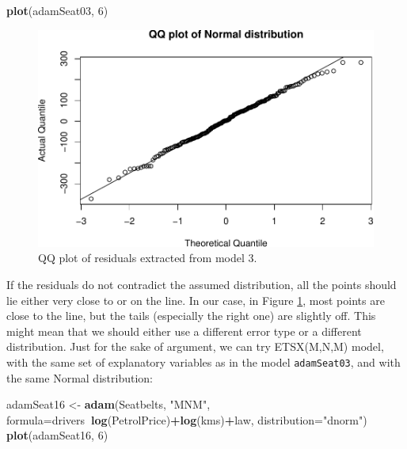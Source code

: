 \documentclass[]{book}
\newenvironment{Shaded}{\begin{snugshade}}{\end{snugshade}}
\newcommand{\DataTypeTok}[1]{\textcolor[rgb]{0.13,0.29,0.53}{#1}}
\newcommand{\DecValTok}[1]{\textcolor[rgb]{0.00,0.00,0.81}{#1}}
\newcommand{\KeywordTok}[1]{\textcolor[rgb]{0.13,0.29,0.53}{\textbf{#1}}}
\newcommand{\NormalTok}[1]{#1}
\newcommand{\OperatorTok}[1]{\textcolor[rgb]{0.81,0.36,0.00}{\textbf{#1}}}
\newcommand{\StringTok}[1]{\textcolor[rgb]{0.31,0.60,0.02}{#1}}
\theoremstyle{definition}
\theoremstyle{definition}
\theoremstyle{definition}
\theoremstyle{definition}
\theoremstyle{remark}
\begin{document}
\begin{Shaded}
\begin{Highlighting}[]
\KeywordTok{plot}\NormalTok{(adamSeat03, }\DecValTok{6}\NormalTok{)}
\end{Highlighting}
\end{Shaded}

\begin{figure}
\centering
\includegraphics{Svetunkov--2022----ADAM_files/figure-latex/adamSeat03QQ-1.pdf}
\caption{\label{fig:adamSeat03QQ}QQ plot of residuals extracted from model 3.}
\end{figure}

If the residuals do not contradict the assumed distribution, all the points should lie either very close to or on the line. In our case, in Figure \ref{fig:adamSeat03QQ}, most points are close to the line, but the tails (especially the right one) are slightly off. This might mean that we should either use a different error type or a different distribution. Just for the sake of argument, we can try ETSX(M,N,M) model, with the same set of explanatory variables as in the model \texttt{adamSeat03}, and with the same Normal distribution:

\begin{Shaded}
\begin{Highlighting}[]
\NormalTok{adamSeat16 <-}\StringTok{ }\KeywordTok{adam}\NormalTok{(Seatbelts, }\StringTok{"MNM"}\NormalTok{,}
                   \DataTypeTok{formula=}\NormalTok{drivers}\OperatorTok{~}\KeywordTok{log}\NormalTok{(PetrolPrice)}\OperatorTok{+}\KeywordTok{log}\NormalTok{(kms)}\OperatorTok{+}\NormalTok{law,}
                   \DataTypeTok{distribution=}\StringTok{"dnorm"}\NormalTok{)}
\KeywordTok{plot}\NormalTok{(adamSeat16, }\DecValTok{6}\NormalTok{)}
\end{Highlighting}
\end{Shaded}
\end{document}
